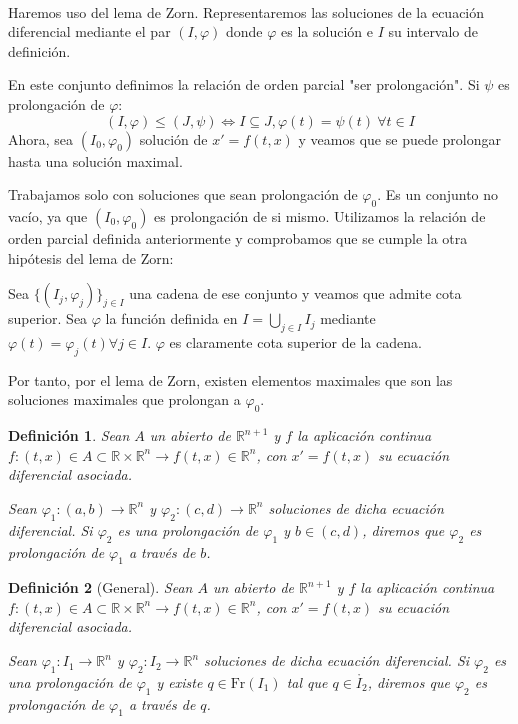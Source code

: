 \documentclass{article}
\makeatletter
\theoremstyle{theorem-style}  %
\theoremstyle{definition-style}
\newtheorem{definition}{Definición}[section]
\theoremstyle{example-style}
\renewenvironment{proof}[1][\proofname]{\par
	\pushQED{\qed}%
	\normalfont \topsep6\p@\@plus6\p@\relax
	\list{}{%
		\settowidth{\leftmargin}{\quad:\hskip\labelsep}%
		\setlength{\labelwidth}{0pt}%
		\setlength{\itemindent}{-\leftmargin}%
	}%
	\item[\hskip\labelsep\itshape#1\@addpunct{:}]\ignorespaces
}{%
	\popQED\endlist\@endpefalse
}
\makeatother
\begin{document}
\begin{proof} \ \\	
	Haremos uso del lema de Zorn. Representaremos las soluciones de la ecuación diferencial mediante el par $ (I,\varphi) $ donde $ \varphi $ es la solución e $ I $ su intervalo de definición.
	
	En este conjunto definimos la relación de orden parcial "ser prolongación". Si $ \psi $ es prolongación de $ \varphi $:
	\[ (I,\varphi)\leq (J,\psi)\Leftrightarrow I\subseteq J, \varphi(t)=\psi(t) \ \forall t \in I \]
	Ahora, sea $ (I_0,\varphi_0) $ solución de $ x'=f(t,x) $ y veamos que se puede prolongar hasta una solución maximal.
	
	Trabajamos solo con soluciones que sean prolongación de $ \varphi_0 $. Es un conjunto no vacío, ya que $ (I_0,\varphi_0) $ es prolongación de si mismo. Utilizamos la relación de orden parcial definida anteriormente y comprobamos que se cumple la otra hipótesis del lema de Zorn:
	
	Sea $ \{(I_j,\varphi_j) \}_{j\in I} $ una cadena de ese conjunto y veamos que admite cota superior. Sea $ \varphi $ la función definida en $ I=\bigcup_{j\in I}I_j $ mediante $ \varphi(t)=\varphi_j(t) \forall j \in I $. $ \varphi $ es claramente cota superior de la cadena.
	
	Por tanto, por el lema de Zorn, existen elementos maximales que son las soluciones maximales que prolongan a $ \varphi_0 $.	
\end{proof}
\begin{definition}
	Sean $ A $ un abierto de $ \mathbb{R}^{n+1} $ y $ f $ la aplicación continua $ f:(t,x)\in A\subset \mathbb{R}\times \mathbb{R}^n \longrightarrow f(t,x)\in \mathbb{R}^n $, con $  x'=f(t,x) $ su ecuación diferencial asociada. 
	
	Sean $ \varphi_1:(a,b)\longrightarrow \mathbb{R}^n $ y $ \varphi_2:(c,d)\longrightarrow \mathbb{R}^n $ soluciones de dicha ecuación diferencial. Si $ \varphi_2 $ es una prolongación de $ \varphi_1 $ y $ b\in(c,d) $, diremos que $ \varphi_2 $ es \emph{prolongación de $ \varphi_1 $ a través de $ b $}.
\end{definition}
\begin{definition}[General]
	Sean $ A $ un abierto de $ \mathbb{R}^{n+1} $ y $ f $ la aplicación continua $ f:(t,x)\in A\subset \mathbb{R}\times \mathbb{R}^n \longrightarrow f(t,x)\in \mathbb{R}^n $, con $  x'=f(t,x) $ su ecuación diferencial asociada. 
	
	Sean $ \varphi_1:I_1\longrightarrow \mathbb{R}^n $ y $ \varphi_2:I_2\longrightarrow \mathbb{R}^n $ soluciones de dicha ecuación diferencial. Si $ \varphi_2 $ es una prolongación de $ \varphi_1 $ y existe $ q\in \text{Fr}(I_1) $ tal que $ q\in \mathring{I_2}$, diremos que $ \varphi_2 $ es \emph{prolongación de $ \varphi_1 $ a través de $ q $}.
\end{definition}
\end{document}
